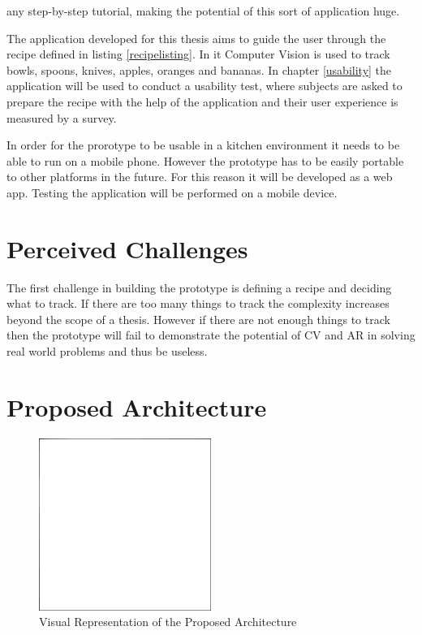 any step-by-step tutorial, making the potential of this sort of application 
huge. \par
	The application developed for this thesis aims to guide the user 
through the recipe defined in listing \ref{recipelisting}. In it Computer 
Vision is used to track bowls, spoons, knives, apples, oranges and bananas. 
In chapter \ref{usability} the application will be used to conduct a usability 
test, where subjects are asked to prepare the recipe with the help of the 
application and their user experience is measured by a survey. \par
	In order for the prorotype to be usable in a kitchen environment it 
needs to be able to run on a mobile phone. However the prototype has to be 
easily portable to other platforms in the future. For this reason it will be 
developed as a web app. Testing the application will be performed on a mobile 
device.

\section{Perceived Challenges} \label{challenges}

The first challenge in building the prototype is defining a recipe and 
deciding what to track. If there are too many things to track the complexity 
increases beyond the scope of a thesis. However if there are not enough 
things to track then the prototype will fail to demonstrate the potential of 
CV and AR in solving real world problems and thus be useless.

\section{Proposed Architecture} \label{arch}

\begin{figure}
\centering \includegraphics[width=0.5\textwidth]{kuvat/placeholder.png}
\caption{Visual Representation of the Proposed Architecture}
\label{Arch fig} 
\end{figure}

